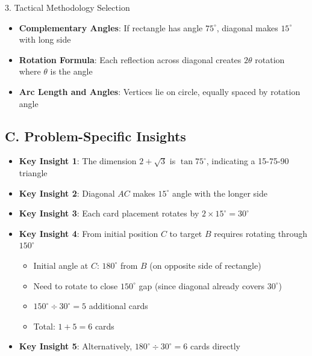 \documentclass[12pt]{article}
\begin{document}
\begin{tacticsbox}{3. Tactical Methodology Selection}
\begin{itemize}[leftmargin=*]
    \item \textbf{Complementary Angles}: If rectangle has angle $75^\circ$, diagonal makes $15^\circ$ with long side
    
    \item \textbf{Rotation Formula}: Each reflection across diagonal creates $2\theta$ rotation where $\theta$ is the angle
    
    \item \textbf{Arc Length and Angles}: Vertices lie on circle, equally spaced by rotation angle
\end{itemize}

\subsection*{C. Problem-Specific Insights}
\begin{itemize}[leftmargin=*]
    \item \textbf{Key Insight 1}: The dimension $2+\sqrt{3}$ is $\tan 75^\circ$, indicating a 15-75-90 triangle
    
    \item \textbf{Key Insight 2}: Diagonal $AC$ makes $15^\circ$ angle with the longer side
    
    \item \textbf{Key Insight 3}: Each card placement rotates by $2 \times 15^\circ = 30^\circ$
    
    \item \textbf{Key Insight 4}: From initial position $C$ to target $B$ requires rotating through $150^\circ$
    \begin{itemize}
        \item Initial angle at $C$: $180^\circ$ from $B$ (on opposite side of rectangle)
        \item Need to rotate to close $150^\circ$ gap (since diagonal already covers $30^\circ$)
        \item $150^\circ \div 30^\circ = 5$ additional cards
        \item Total: $1 + 5 = 6$ cards
    \end{itemize}
    
    \item \textbf{Key Insight 5}: Alternatively, $180^\circ \div 30^\circ = 6$ cards directly
\end{itemize}

\end{tacticsbox}
\end{document}
